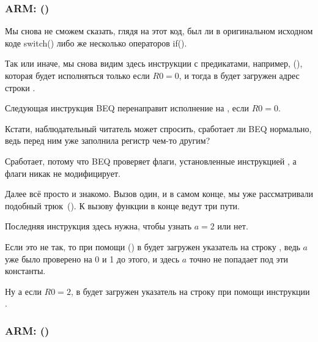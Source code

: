 \subsubsection{ARM: \OptimizingKeilVI (\ARMMode)}



Мы снова не сможем сказать, глядя на этот код, был ли в оригинальном исходном коде switch() 
либо же несколько операторов if().

Так или иначе, мы снова видим здесь инструкции с предикатами, например, \ADREQ (), 
которая будет исполняться только
если $R0=0$, и тогда в  будет загружен адрес строки .

Следующая инструкция \ac{BEQ} перенаправит исполнение на , если $R0=0$.

Кстати, наблюдательный читатель может спросить, сработает ли \ac{BEQ} нормально,
ведь \ADREQ перед ним уже заполнила регистр  чем-то другим?

Сработает, потому что \ac{BEQ} проверяет флаги, установленные инструкцией \CMP, 
а \ADREQ флаги никак не модифицирует.

Далее всё просто и знакомо. 
Вызов \printf один, и в самом конце, мы уже рассматривали подобный трюк~().
К вызову функции \printf{} в конце ведут три пути.

Последняя инструкция  здесь нужна, чтобы узнать $a=2$ или нет.

Если это не так, то при помощи \ADRNE () в  будет загружен указатель на 
строку , ведь $a$ уже было проверено на 0 и 1 до этого, 
и здесь $a$ точно не попадает под эти константы.

Ну а если $R0=2$, в  будет загружен указатель на строку  при помощи инструкции \ADREQ.

\subsubsection{ARM: \OptimizingKeilVI (\ThumbMode)}



